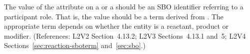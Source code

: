 The value of the  attribute on a \SpeciesReference or a
\ModifierSpeciesReference should be an SBO identifier referring to a
participant role.  That is, the value should be a term derived
from \sboparticipantrole.  The appropriate term depends on whether
the entity is a reactant, product or modifier.  (References: 
L2V2 Section~4.13.2; L2V3 Sections~4.13.1 and~5; L2V4 Sections~\ref{sec:reaction-sboterm} and~\ref{sec:sbo}.)

